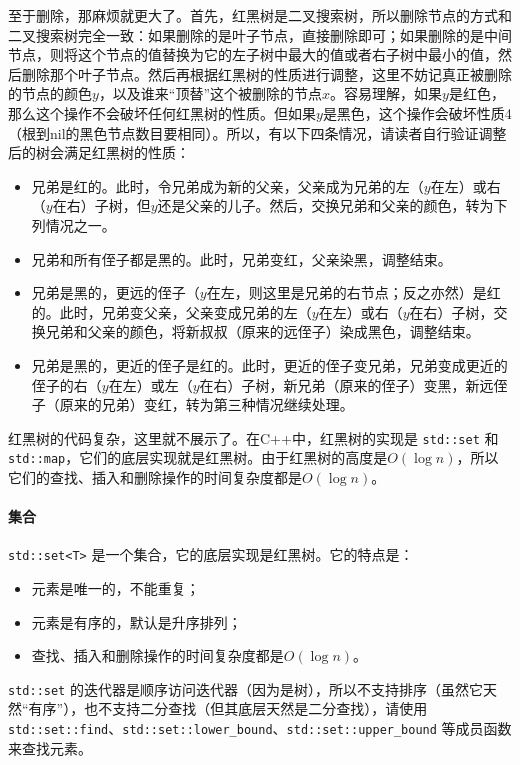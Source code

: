 至于删除，那麻烦就更大了。首先，红黑树是二叉搜索树，所以删除节点的方式和二叉搜索树完全一致：如果删除的是叶子节点，直接删除即可；如果删除的是中间节点，则将这个节点的值替换为它的左子树中最大的值或者右子树中最小的值，然后删除那个叶子节点。然后再根据红黑树的性质进行调整，这里不妨记真正被删除的节点的颜色$y$，以及谁来“顶替”这个被删除的节点$x$。容易理解，如果$y$是红色，那么这个操作不会破坏任何红黑树的性质。但如果$y$是黑色，这个操作会破坏性质4（根到nil的黑色节点数目要相同）。所以，有以下四条情况，请读者自行验证调整后的树会满足红黑树的性质：
\begin{itemize}
    \item 兄弟是红的。此时，令兄弟成为新的父亲，父亲成为兄弟的左（$y$在左）或右（$y$在右）子树，但$y$还是父亲的儿子。然后，交换兄弟和父亲的颜色，转为下列情况之一。
    \item 兄弟和所有侄子都是黑的。此时，兄弟变红，父亲染黑，调整结束。
    \item 兄弟是黑的，更远的侄子（$y$在左，则这里是兄弟的右节点；反之亦然）是红的。此时，兄弟变父亲，父亲变成兄弟的左（$y$在左）或右（$y$在右）子树，交换兄弟和父亲的颜色，将新叔叔（原来的远侄子）染成黑色，调整结束。
    \item 兄弟是黑的，更近的侄子是红的。此时，更近的侄子变兄弟，兄弟变成更近的侄子的右（$y$在左）或左（$y$在右）子树，新兄弟（原来的侄子）变黑，新远侄子（原来的兄弟）变红，转为第三种情况继续处理。
\end{itemize}

红黑树的代码复杂，这里就不展示了。在C++中，红黑树的实现是 \verb|std::set| 和 \verb|std::map|，它们的底层实现就是红黑树。由于红黑树的高度是$O(\log n)$，所以它们的查找、插入和删除操作的时间复杂度都是$O(\log n)$。

\paragraph{集合} \verb|std::set<T>| 是一个集合，它的底层实现是红黑树。它的特点是：
\begin{itemize}
    \item 元素是唯一的，不能重复；
    \item 元素是有序的，默认是升序排列；
    \item 查找、插入和删除操作的时间复杂度都是$O(\log n)$。
\end{itemize}

\verb|std::set| 的迭代器是顺序访问迭代器（因为是树），所以不支持排序（虽然它天然“有序”），也不支持二分查找（但其底层天然是二分查找），请使用 \verb|std::set::find|、\verb|std::set::lower_bound|、\verb|std::set::upper_bound| 等成员函数来查找元素。

